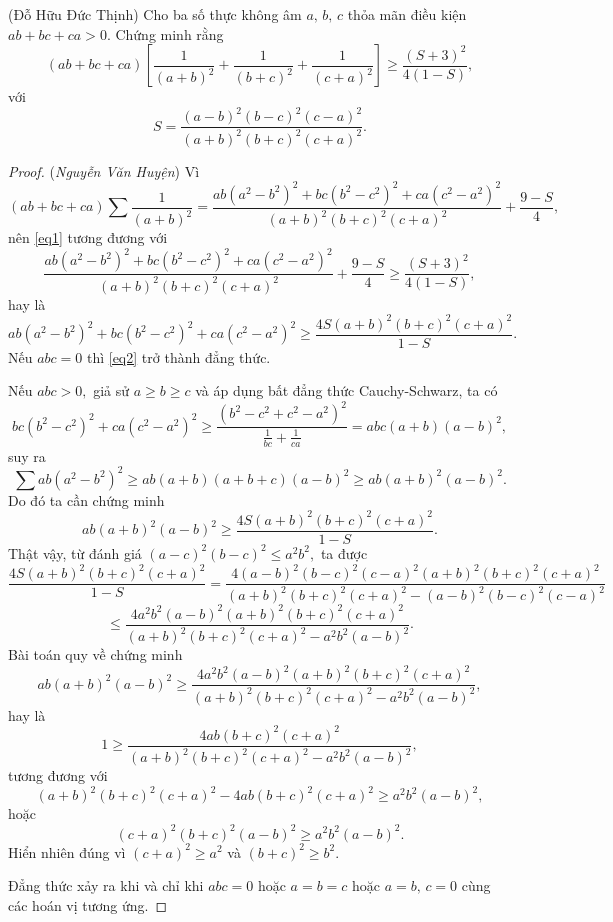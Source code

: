 \documentclass[12pt,a4paper]{book}
\begin{document}
\begin{bt}
(Đỗ Hữu Đức Thịnh) Cho ba số thực không âm $a,\,b,\,c$ thỏa mãn điều kiện $ab+bc+ca>0.$ Chứng minh rằng
\begin{equation}\label{eq1}
(ab+bc+ca)\left[\dfrac{1}{(a+b)^2}+\dfrac{1}{(b+c)^2}+\dfrac{1}{(c+a)^2}\right] \geq \frac{(S+3)^2}{4(1-S)},
\end{equation}
với $$S=\dfrac{(a-b)^2(b-c)^2(c-a)^2}{(a+b)^2(b+c)^2(c+a)^2}.$$
\end{bt}

\begin{proof} (\textit{Nguyễn Văn Huyện}) Vì
\[(ab+bc+ca) \sum \frac{1}{(a+b)^2} = \frac{ab(a^2-b^2)^2+bc(b^2-c^2)^2+ca(c^2-a^2)^2}{(a+b)^2(b+c)^2(c+a)^2} + \frac{9-S}{4},\]
nên \eqref{eq1} tương đương với
\[\frac{ab(a^2-b^2)^2+bc(b^2-c^2)^2+ca(c^2-a^2)^2}{(a+b)^2(b+c)^2(c+a)^2} + \frac{9-S}{4} \geqslant \frac{(S+3)^2}{4(1-S)},\]
hay là
\begin{equation}\label{eq2}
ab(a^2-b^2)^2+bc(b^2-c^2)^2+ca(c^2-a^2)^2 \ge \frac{4S(a+b)^2(b+c)^2(c+a)^2}{1-S}.
\end{equation}
Nếu $abc=0$ thì \eqref{eq2} trở thành đẳng thức.

Nếu $abc > 0,$ giả sử $a \ge b \ge c$ và áp dụng bất đẳng thức Cauchy-Schwarz, ta có 
\[bc(b^2-c^2)^2+ca(c^2-a^2)^2 \ge \frac{(b^2-c^2+c^2-a^2)^2}{\frac{1}{bc}+\frac{1}{ca}} = abc(a+b)(a-b)^2,\]
suy ra
\[\sum ab(a^2-b^2)^2 \geqslant ab(a+b)(a+b+c)(a-b)^2 \ge ab(a+b)^2(a-b)^2.\]
Do đó ta cần chứng minh
\[ab(a+b)^2(a-b)^2 \geq \frac{4S(a+b)^2(b+c)^2(c+a)^2}{1-S}.\]
Thật vậy, từ đánh giá $(a-c)^2(b-c)^2 \leqslant a^2b^2,$ ta được
\[\frac{4S(a+b)^2(b+c)^2(c+a)^2}{1-S} = \frac{4(a-b)^2(b-c)^2(c-a)^2(a+b)^2(b+c)^2(c+a)^2}{(a+b)^2(b+c)^2(c+a)^2-(a-b)^2(b-c)^2(c-a)^2}\]
\[\leqslant \frac{4a^2b^2(a-b)^2(a+b)^2(b+c)^2(c+a)^2}{(a+b)^2(b+c)^2(c+a)^2-a^2b^2(a-b)^2}.\]
Bài toán quy về chứng minh
\[ab(a+b)^2(a-b)^2 \ge \frac{4a^2b^2(a-b)^2(a+b)^2(b+c)^2(c+a)^2}{(a+b)^2(b+c)^2(c+a)^2-a^2b^2(a-b)^2},\]
hay là
\[1 \ge \frac{4ab(b+c)^2(c+a)^2}{(a+b)^2(b+c)^2(c+a)^2-a^2b^2(a-b)^2},\]
tương đương với
\[(a+b)^2(b+c)^2(c+a)^2 - 4ab(b+c)^2(c+a)^2 \ge a^2b^2(a-b)^2,\]
hoặc
\[(c+a)^2(b+c)^2(a-b)^2 \ge a^2b^2(a-b)^2.\]
Hiển nhiên đúng vì $(c+a)^2 \ge a^2$ và $(b+c)^2 \ge b^2.$

Đẳng thức xảy ra khi và chỉ khi $abc=0$ hoặc $a=b=c$ hoặc $a=b,\,c=0$ cùng các hoán vị tương ứng. 
\end{proof}
\end{document}
